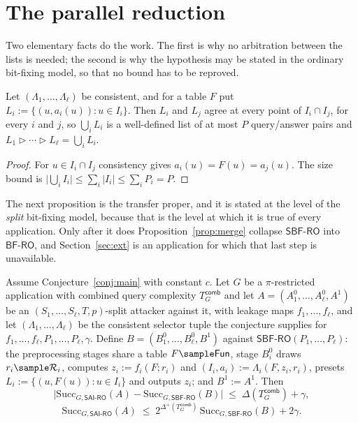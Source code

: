 \documentclass{conjura-conjecture}
\newcommand{\Fun}{\mathsf{Fun}}
\newcommand{\Succ}{\mathrm{Succ}}
\newcommand{\SAI}{\mathsf{SAI\text{-}RO}}
\newcommand{\SBF}{\mathsf{SBF\text{-}RO}}
\newcommand{\BF}{\mathsf{BF\text{-}RO}}
\newcommand{\Tcomb}{T^{\mathsf{comb}}_{G}}
\newcommand{\merge}{\mathbin{\triangleright}}
\begin{document}
\section{The parallel reduction}\label{sec:theorem}

Two elementary facts do the work. The first is why no arbitration between
the lists is needed; the second is why the hypothesis may be stated in the
ordinary bit-fixing model, so that no bound has to be reproved.

\begin{proposition}\label{prop:noconflict}
Let $(\Lambda_1,\dots,\Lambda_\ell)$ be consistent, and for a table $F$
put $L_i := \{(u,a_i(u)) : u \in I_i\}$. Then $L_i$ and $L_j$ agree at
every point of $I_i \cap I_j$, for every $i$ and $j$, so $\bigcup_i L_i$
is a well-defined list of at most $P$ query/answer pairs and
$L_1 \merge \cdots \merge L_\ell = \bigcup_i L_i$.
\end{proposition}

\begin{proof}
For $u \in I_i \cap I_j$ consistency gives $a_i(u) = F(u) = a_j(u)$. The
size bound is $\bigl|\bigcup_i I_i\bigr| \le \sum_i |I_i| \le \sum_i P_i =
P$.
\end{proof}

The next proposition is the transfer proper, and it is stated at the level
of the \emph{split} bit-fixing model, because that is the level at which
it is true of every application. Only after it does
Proposition~\ref{prop:merge} collapse $\SBF$ into $\BF$, and
Section~\ref{sec:ext} is an application for which that last step is
unavailable.

\begin{proposition}
\label{prop:sbf}
Assume Conjecture~\ref{conj:main} with constant $c$. Let $G$ be a
$\pi$-restricted application with combined query complexity $\Tcomb$ and
let $A = (A^{0}_1,\dots,A^{0}_\ell,A^{1})$ be an
$(S_1,\dots,S_\ell,T,p)$-split attacker against it, with leakage maps
$f_1,\dots,f_\ell$, and let $(\Lambda_1,\dots,\Lambda_\ell)$ be the
consistent selector tuple the conjecture supplies for
$f_1,\dots,f_\ell,P_1,\dots,P_\ell,\gamma$. Define
$B = (B^{0}_1,\dots,B^{0}_\ell,B^{1})$ against
$\SBF(P_1,\dots,P_\ell)$: the preprocessing stages share a table
$F \sample \Fun$, stage $B^{0}_i$ draws $r_i \sample \mathcal{R}_i$,
computes $z_i := f_i(F;r_i)$ and $(I_i,a_i) := \Lambda_i(F,z_i,r_i)$,
presets $L_i := \{(u,F(u)) : u \in I_i\}$ and outputs $z_i$; and
$B^{1} := A^{1}$. Then
\[
  \bigl|\Succ_{G,\SAI}(A) - \Succ_{G,\SBF}(B)\bigr|
  \;\le\; \Delta(\Tcomb) + \gamma ,
\]
\[
  \Succ_{G,\SAI}(A)
  \;\le\; 2^{\Delta^{+}(\Tcomb)}\,\Succ_{G,\SBF}(B) + 2\gamma .
\]
\end{proposition}
\end{document}
